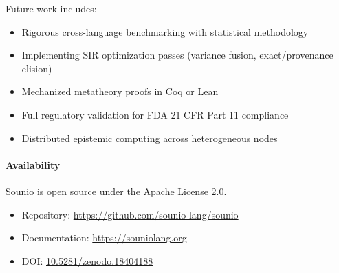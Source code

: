 \documentclass[11pt,a4paper]{article}
\begin{document}
Future work includes:
\begin{itemize}
  \item Rigorous cross-language benchmarking with statistical methodology
  \item Implementing SIR optimization passes (variance fusion, exact/provenance elision)
  \item Mechanized metatheory proofs in Coq or Lean
  \item Full regulatory validation for FDA 21 CFR Part 11 compliance
  \item Distributed epistemic computing across heterogeneous nodes
\end{itemize}

\paragraph{Availability}
Sounio is open source under the Apache License 2.0.
\begin{itemize}
  \item Repository: \url{https://github.com/sounio-lang/sounio}
  \item Documentation: \url{https://souniolang.org}
  \item DOI: \href{https://doi.org/10.5281/zenodo.18404188}{10.5281/zenodo.18404188}
\end{itemize}



\end{document}
